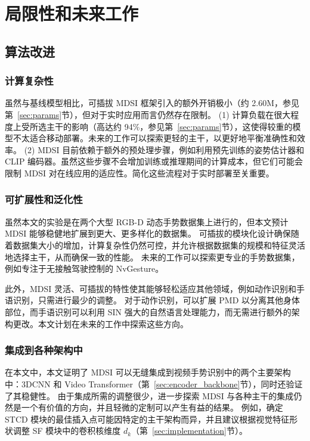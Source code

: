 
\chapter{局限性和未来工作}
\label{sec:limitations}
\section{算法改进}
\subsection{计算复杂性}
虽然与基线模型相比，可插拔 MDSI 框架引入的额外开销极小（约 2.60M，参见第~\ref{sec:params}节），但对于实时应用而言仍然存在限制。
(1) 计算负载在很大程度上受所选主干的影响（高达约 94\%，参见第~\ref{sec:params}节），这使得较重的模型不太适合移动部署。未来的工作可以探索更轻的主干，以更好地平衡准确性和效率。 (2) MDSI 目前依赖于额外的预处理步骤，例如利用预先训练的姿势估计器和 CLIP 编码器。虽然这些步骤不会增加训练或推理期间的计算成本，但它们可能会限制 MDSI 对在线应用的适应性。简化这些流程对于实时部署至关重要。

\subsection{可扩展性和泛化性}
虽然本文的实验是在两个大型 RGB-D 动态手势数据集上进行的，但本文预计 MDSI 能够稳健地扩展到更大、更多样化的数据集。
可插拔的模块化设计确保随着数据集大小的增加，计算复杂性仍然可控，并允许根据数据集的规模和特征灵活地选择主干，从而确保一致的性能。
未来的工作可以探索更专业的手势数据集，例如专注于无接触驾驶控制的 NvGesture。

此外，MDSI 灵活、可插拔的特性使其能够轻松适应其他领域，例如动作识别和手语识别，只需进行最少的调整。
对于动作识别，可以扩展 PMD 以分离其他身体部位，而手语识别可以利用 SIN 强大的自然语言处理能力，而无需进行额外的架构更改。本文计划在未来的工作中探索这些方向。

\subsection{集成到各种架构中}
在本文中，本文证明了 MDSI 可以无缝集成到视频手势识别中的两个主要架构中：3DCNN 和 Video Transformer（第~\ref{sec:encoder_backbone}节），同时还验证了其稳健性。
由于集成所需的调整很少，进一步探索 MDSI 与各种主干的集成仍然是一个有价值的方向，并且轻微的定制可以产生有益的结果。
例如，确定 STCD 模块的最佳插入点可能因特定的主干架构而异，并且建议根据视觉特征形状调整 SF 模块中的卷积核维度 \(d_k\)（第~\ref{sec:implementation}节）。

